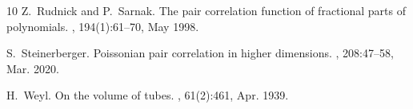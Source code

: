 \documentclass[a4paper,11pt]{amsart}
\begin{document}
\begin{thebibliography}{10}
Z.~Rudnick and P.~Sarnak.
\newblock The pair correlation function of fractional parts of polynomials.
, 194(1):61–70, May 1998.


S.~Steinerberger.
\newblock Poissonian pair correlation in higher dimensions.
, 208:47–58, Mar. 2020.

H.~Weyl.
\newblock On the volume of tubes.
, 61(2):461, Apr. 1939.

\end{thebibliography}
\end{document}

